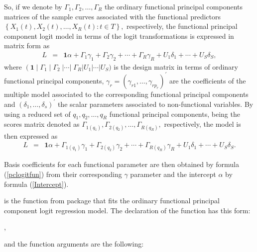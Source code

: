 So, if we denote by $\Gamma_1,\Gamma_2,\ldots,\Gamma_R$ the ordinary functional principal components matrices of the sample curves associated with the functional predictors $\left\{ X_1\left( t\right),X_2\left( t\right),\ldots,X_R\left( t\right) :t\in T\right\}, $ respectively, the functional principal component logit model in terms of the logit transformations is expressed in matrix form as
\begin{eqnarray*}
L&=& \mathbf{1}\alpha + \Gamma_1 \gamma_1 + \Gamma_2 \gamma_2 + \cdots + \Gamma_R \gamma_R+U_1 \delta_1+\cdots+U_S \delta_S,
\end{eqnarray*}
where $\left( \mathbf{1}\;|\;\Gamma_1\;|\;\Gamma_2\;| \cdots |\;\Gamma_R \right|U_1 | \cdots |U_S ) $ is the design matrix in terms of ordinary functional principal components, $\gamma_r =\left( \gamma_{r1},\ldots ,\gamma_{rp_r}\right)^{\prime }$ are the coefficients of the multiple model associated to the corresponding functional principal components and $\left( \delta_{1},\ldots ,\delta_{s}\right)^{\prime }$ the scalar parameters associated to non-functional variables. By using a reduced set of $q_1,q_2,\ldots,q_R$ functional principal components, being the scores matrix denoted as $\Gamma_{1(q_1)},\Gamma_{2(q_2)},\ldots,\Gamma_{R(q_R)},$ respectively, the model is then expressed as
\begin{eqnarray*}
L&=& \mathbf{1}\alpha + \Gamma_{1(q_1)} \gamma_1 + \Gamma_{2(q_2)} \gamma_2 + \cdots + \Gamma_{R(q_R)} \gamma_R +U_1 \delta_1+\cdots+U_S \delta_S.
\end{eqnarray*}

Basis coefficients for each functional parameter are then obtained by formula (\ref{pclogitfun}) from their corresponding $\gamma$ parameter and the intercept $\alpha$ by formula (\ref{Intercept}).

 is the function from  package that fits the ordinary functional principal component logit regression model. The declaration of the function has this form: \begin{center} , \end{center} and the function arguments are the following:

